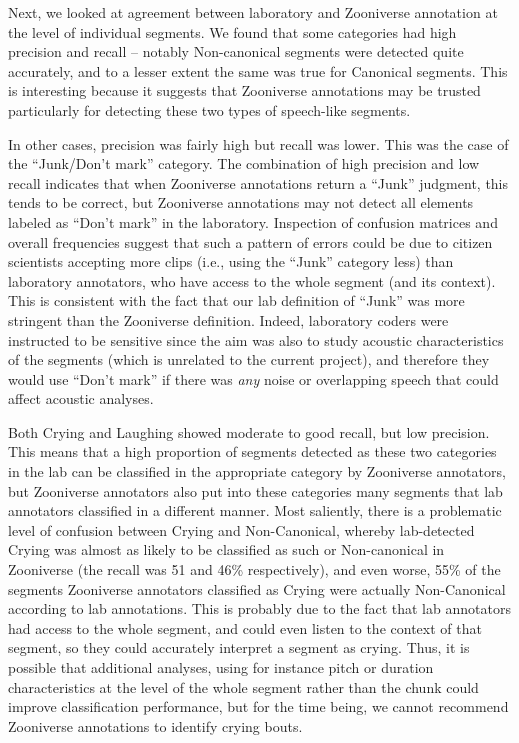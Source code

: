 \documentclass[english,,man]{apa6}
\begin{document}
Next, we looked at agreement between laboratory and Zooniverse annotation at the level of individual segments. We found that some categories had high precision and recall -- notably Non-canonical segments were detected quite accurately, and to a lesser extent the same was true for Canonical segments. This is interesting because it suggests that Zooniverse annotations may be trusted particularly for detecting these two types of speech-like segments.

In other cases, precision was fairly high but recall was lower. This was the case of the \enquote{Junk/Don't mark} category. The combination of high precision and low recall indicates that when Zooniverse annotations return a \enquote{Junk} judgment, this tends to be correct, but Zooniverse annotations may not detect all elements labeled as \enquote{Don't mark} in the laboratory. Inspection of confusion matrices and overall frequencies suggest that such a pattern of errors could be due to citizen scientists accepting more clips (i.e., using the \enquote{Junk} category less) than laboratory annotators, who have access to the whole segment (and its context). This is consistent with the fact that our lab definition of \enquote{Junk} was more stringent than the Zooniverse definition. Indeed, laboratory coders were instructed to be sensitive since the aim was also to study acoustic characteristics of the segments (which is unrelated to the current project), and therefore they would use \enquote{Don't mark} if there was \emph{any} noise or overlapping speech that could affect acoustic analyses.

Both Crying and Laughing showed moderate to good recall, but low precision. This means that a high proportion of segments detected as these two categories in the lab can be classified in the appropriate category by Zooniverse annotators, but Zooniverse annotators also put into these categories many segments that lab annotators classified in a different manner. Most saliently, there is a problematic level of confusion between Crying and Non-Canonical, whereby lab-detected Crying was almost as likely to be classified as such or Non-canonical in Zooniverse (the recall was 51 and 46\% respectively), and even worse, 55\% of the segments Zooniverse annotators classified as Crying were actually Non-Canonical according to lab annotations. This is probably due to the fact that lab annotators had access to the whole segment, and could even listen to the context of that segment, so they could accurately interpret a segment as crying. Thus, it is possible that additional analyses, using for instance pitch or duration characteristics at the level of the whole segment rather than the chunk could improve classification performance, but for the time being, we cannot recommend Zooniverse annotations to identify crying bouts.
\end{document}
